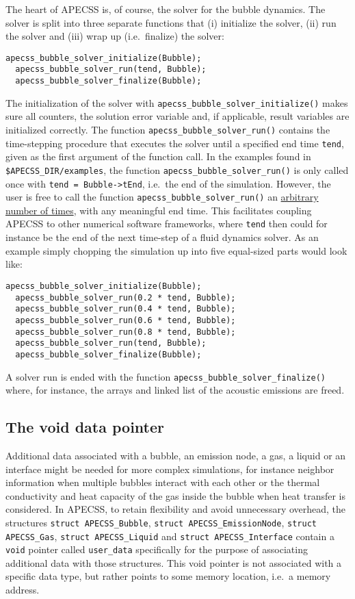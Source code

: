 The heart of APECSS is, of course, the solver for the bubble dynamics. The solver is split into three separate functions that (i) initialize the solver, (ii) run the solver and (iii) wrap up (i.e.~finalize) the solver:
\begin{lstlisting}[style=CStyle,numbers=none]
  apecss_bubble_solver_initialize(Bubble);
  apecss_bubble_solver_run(tend, Bubble);
  apecss_bubble_solver_finalize(Bubble);
\end{lstlisting}\vspace{-0.75em}
The initialization of the solver with {\tt apecss\_bubble\_solver\_initialize()} makes sure all counters, the solution error variable and, if applicable, result variables are initialized correctly. The function {\tt apecss\_bubble\_solver\_run()} contains the time-stepping procedure that executes the solver until a specified end time {\tt tend}, given as the first argument of the function call. In the examples found in {\tt \$APECSS\_DIR/examples}, the function {\tt apecss\_bubble\_solver\_run()} is only called once with {\tt tend = Bubble->tEnd}, i.e.~the end of the simulation. However, the user is free to call the function {\tt apecss\_bubble\_solver\_run()} an \uline{arbitrary number of times}, with any meaningful end time. This facilitates coupling APECSS to other numerical software frameworks, where {\tt tend} then could for instance be the end of the next time-step of a fluid dynamics solver. As an example simply chopping the simulation up into five equal-sized parts would look like:
\begin{lstlisting}[style=CStyle,numbers=none]
  apecss_bubble_solver_initialize(Bubble);
  apecss_bubble_solver_run(0.2 * tend, Bubble);
  apecss_bubble_solver_run(0.4 * tend, Bubble);
  apecss_bubble_solver_run(0.6 * tend, Bubble);
  apecss_bubble_solver_run(0.8 * tend, Bubble);
  apecss_bubble_solver_run(tend, Bubble);
  apecss_bubble_solver_finalize(Bubble);
\end{lstlisting}\vspace{-0.75em}
A solver run is ended with the function {\tt apecss\_bubble\_solver\_finalize()} where, for instance, the arrays and linked list of the acoustic emissions are freed.

\subsection{The void data pointer}

Additional data associated with a bubble, an emission node, a gas, a liquid or an interface might be needed for more complex simulations, for instance neighbor information when multiple bubbles interact with each other or the thermal conductivity and heat capacity of the gas inside the bubble when heat transfer is considered. In APECSS, to retain flexibility and avoid unnecessary overhead, the structures {\tt struct APECSS\_Bubble}, {\tt struct APECSS\_EmissionNode}, {\tt struct APECSS\_Gas}, {\tt struct APECSS\_Liquid} and {\tt struct APECSS\_Interface} contain a \texttt{void} pointer called \texttt{user\_data} specifically for the purpose of associating additional data with those structures. This void pointer is not associated with a specific data type, but rather points to some memory location, i.e.~a memory address. 


